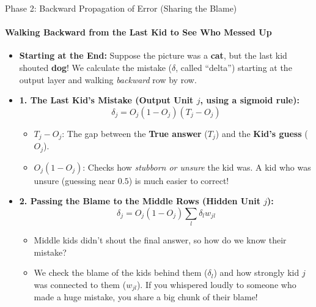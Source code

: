 \documentclass[aspectratio=169]{beamer}
\begin{document}
\begin{frame}{Phase 2: Backward Propagation of Error (Sharing the Blame)}
\framesubtitle{Walking Backward from the Last Kid to See Who Messed Up}

\begin{itemize}
    \scriptsize
    \item \textbf{Starting at the End:}
    Suppose the picture was a \textbf{cat}, but the last kid shouted \textbf{dog}! We calculate the mistake ($\delta$, called ``delta'') starting at the output layer and walking \textit{backward} row by row.

    \item \textbf{1. The Last Kid's Mistake (Output Unit $j$, using a sigmoid rule):}
    \[
        \delta_j = O_j(1 - O_j)(T_j - O_j)
    \]
    \vspace{-5mm}
    \begin{itemize}
        \scriptsize
        \item $T_j - O_j$: The gap between the \textbf{True answer} ($T_j$) and the \textbf{Kid's guess} ($O_j$).
        \item $O_j(1 - O_j)$: Checks how \textit{stubborn or unsure} the kid was. A kid who was unsure (guessing near $0.5$) is much easier to correct!
    \end{itemize}

    \item \textbf{2. Passing the Blame to the Middle Rows (Hidden Unit $j$):}
    \[
        \delta_j = O_j(1 - O_j) \sum_l \delta_l w_{jl}
    \]
    \vspace{-5mm}
    \begin{itemize}
        \scriptsize
        \item Middle kids didn't shout the final answer, so how do we know their mistake?
        \item We check the blame of the kids behind them ($\delta_l$) and how strongly kid $j$ was connected to them ($w_{jl}$). If you whispered loudly to someone who made a huge mistake, you share a big chunk of their blame!
    \end{itemize}
\end{itemize}
\end{frame}
\end{document}
